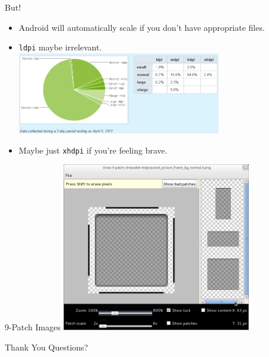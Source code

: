 \documentclass{beamer}
\begin{document}
\begin{frame}{But!}
\begin{itemize}
\item Android will automatically scale if you don't have appropriate
  files.
\item \texttt{ldpi} maybe irrelevant.\\
\includegraphics[width=3.5in]{densities.png}
\item Maybe just \texttt{xhdpi} if you're feeling brave.
\end{itemize}
\end{frame}

\begin{frame}{9-Patch Images}
\includegraphics[width=3.25in]{draw9patch.png}
\end{frame}

\begin{frame}{Thank You}
Questions?
\end{frame}
\end{document}
